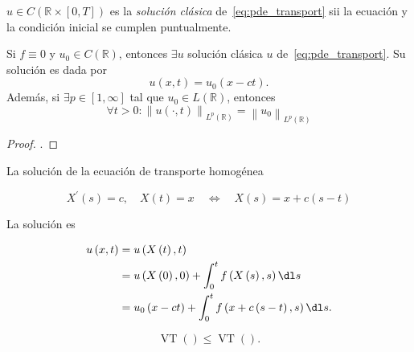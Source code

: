\begin{definition}
    $u\in C\left(\mathbb{R}\times\left[0,T\right]\right)$ es la
    \emph{solución clásica} de~\eqref{eq:pde_transport} sii la
    ecuación y la condición inicial se cumplen puntualmente.
\end{definition}

\begin{theorem}
    Si $f\equiv0$ y $u_{0}\in C\left(\mathbb{R}\right)$, entonces
    $\exists u$ solución clásica $u$ de~\eqref{eq:pde_transport}.
    Su solución es dada por
    \begin{equation*}
        u\left(x,t\right)=
        u_{0}\left(x-ct\right).
    \end{equation*}
    Además, si $\exists p\in\left[1,\infty\right]$ tal que
    $u_{0}\in L\left(\mathbb{R}\right)$, entonces
    \begin{equation*}
        \forall t>0:
        {
        \left\|
        u\left(\cdot,t\right)
        \right\|
        }_{L^{p}\left(\mathbb{R}\right)}=
            {
                \left\|
                u_{0}
                \right\|
            }_{L^{p}\left(\mathbb{R}\right)}
    \end{equation*}
\end{theorem}

\begin{proof}
    .
\end{proof}

La solución de la ecuación de transporte homogénea

\begin{equation*}
    X^{\prime}\left(s\right)=c,\quad
    X\left(t\right)=x\quad\iff\quad
    X\left(s\right)=x+c\left(s-t\right)
\end{equation*}

La solución es

\begin{align*}
    u\left(x,t\right) & =
    u\left(X\left(t\right),t\right)      \\
                      & =
    u\left(X\left(0\right),0\right)+
    \int_{0}^{t}
    f\left(X\left(s\right),s\right)\dl s \\
                      & =
    u_{0}\left(x-ct\right)+
    \int_{0}^{t}
    f\left(x+c\left(s-t\right),s\right)\dl s.
\end{align*}

\begin{definition} %
    \begin{equation*}
        \operatorname{VT}\left(\right)\leq
        \operatorname{VT}\left(\right).
    \end{equation*}
\end{definition}

